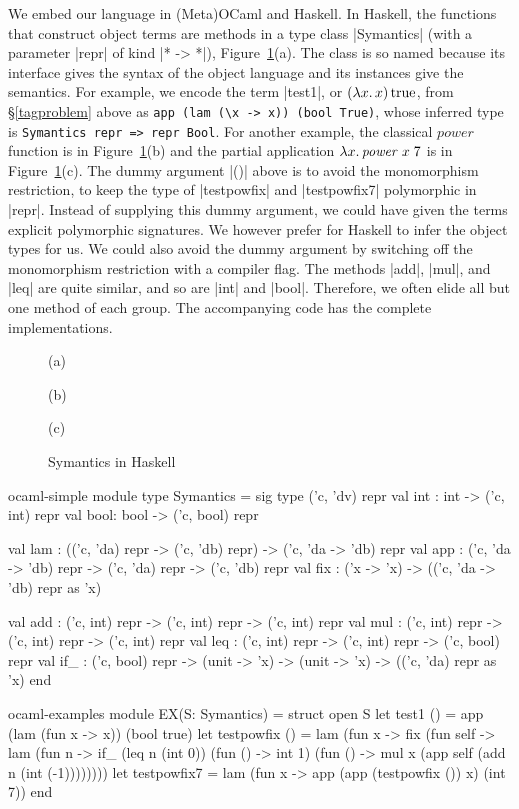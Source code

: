 We embed our language in (Meta)OCaml and Haskell.  In Haskell,
the functions that construct object terms are methods in a type class
|Symantics| (with a parameter |repr| of kind |* -> *|)\ifshort,
Figure~\ref{fig:symantics-haskell}(a)\fi. The class is so named
because its interface gives the syntax of the object language and its
instances give the semantics.
\ifshort\else{}\fi
For example, we encode the term |test1|, or $(\mathopen{\lambda\mathord{x}.\,}x)\mathinner{\mathrm{true}}$, from
\S\ref{tagproblem} above as \texttt{app (lam (\textbackslash x -> x)) (bool True)},
whose inferred type is \texttt{Symantics repr => repr Bool}.
For another example, the classical $\mathit{power}$ function is
\ifshort in Figure~\ref{fig:symantics-haskell}(b)
\else{}\fi
and the partial application $\mathopen{\lambda\mathord{x}.\,} \mathit{power}\;x\;7$ is
\ifshort in Figure~\ref{fig:symantics-haskell}(c).
\else{}\fi
The dummy argument |()| above is to avoid the monomorphism
restriction, to keep the type of |testpowfix| and |testpowfix7|
polymorphic in |repr|. \ifshort\else Instead of supplying this dummy
argument, we could have given the terms explicit polymorphic
signatures.  We however prefer for
Haskell to infer the object types for us. We could also
avoid the dummy argument by switching off the monomorphism restriction
with a compiler flag. \fi
The methods |add|, |mul|, and |leq| are quite similar, and so are
|int| and |bool|. Therefore, we often elide all but
one method of each group. The
accompanying code has the complete implementations.

\ifshort
\begin{figure}
(a) 

\smallskip
(b) 

\smallskip
(c) 

\medskip
\caption{Symantics in Haskell}
\label{fig:symantics-haskell}
\end{figure}
\fi

\begin{SaveVerbatim}{ocaml-simple}
module type Symantics = sig type ('c, 'dv) repr
  val int : int  -> ('c, int) repr
  val bool: bool -> ('c, bool) repr

  val lam : (('c, 'da) repr -> ('c, 'db) repr) -> ('c, 'da -> 'db) repr
  val app : ('c, 'da -> 'db) repr -> ('c, 'da) repr -> ('c, 'db) repr
  val fix : ('x -> 'x) -> (('c, 'da -> 'db) repr as 'x)

  val add : ('c, int) repr -> ('c, int) repr -> ('c, int) repr
  val mul : ('c, int) repr -> ('c, int) repr -> ('c, int) repr
  val leq : ('c, int) repr -> ('c, int) repr -> ('c, bool) repr
  val if_ : ('c, bool) repr
            -> (unit -> 'x) -> (unit -> 'x) -> (('c, 'da) repr as 'x)
end
\end{SaveVerbatim}
\begin{SaveVerbatim}{ocaml-examples}
module EX(S: Symantics) = struct open S
  let test1 () = app (lam (fun x -> x)) (bool true)
  let testpowfix () =
       lam (fun x -> fix (fun self -> lam (fun n ->
        if_ (leq n (int 0)) (fun () -> int 1)
            (fun () -> mul x (app self (add n (int (-1))))))))
  let testpowfix7 = lam (fun x -> app (app (testpowfix ()) x) (int 7))
end
\end{SaveVerbatim}

